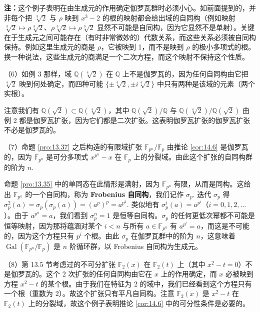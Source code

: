 \begin{example}
\noindent\textbf{注：}这个例子表明在由生成元的作用确定伽罗瓦群时必须小心。如前面提到的，并非每个把 \(\sqrt[3]{2}\) 与 \(\rho\) 映到 \(x^3-2\) 的根的映射都会给出域的自同构（例如映射 \(\sqrt[3]{2} \mapsto \rho\sqrt[3]{2}\)、\(\rho\sqrt[3]{2} \mapsto \rho\sqrt[3]{2}\) 显然不可能是自同构，因为它显然不是单射）。关键在于生成元之间可能存在（有时非常微妙的）代数关系，而这些关系必须被自同构保持。例如这里生成元的商是 \(\rho\)，它被映到 1，而不是映到 \(\rho\) 的极小多项式的根。换一种说法，这些生成元的商满足一个二次方程，而这个映射不保持这个性质。

（6）如例 3 那样，域 \(\mathbb{Q}(\sqrt[4]{2})\) 在 \(\mathbb{Q}\) 上不是伽罗瓦的，因为任何自同构由它把 \(\sqrt[4]{2}\) 映到何处确定，而四种可能 \(\{\pm\sqrt[4]{2}, \pm i\sqrt[4]{2}\}\) 中只有两种是该域的元素（两个实根）。

注意我们有 \(\mathbb{Q}(\sqrt{2}) \subset \mathbb{Q}(\sqrt[4]{2})\)，其中 \(\mathbb{Q}(\sqrt{2})/\mathbb{Q}\) 与 \(\mathbb{Q}(\sqrt[4]{2})/\mathbb{Q}(\sqrt{2})\) 由例 2 都是伽罗瓦扩张，因为它们都是二次扩张。这表明伽罗瓦扩张的伽罗瓦扩张不必是伽罗瓦的。

（7）命题 \ref{pro:13.37} 之后构造的有限域扩张 \(\mathbb{F}_{p^n}/\mathbb{F}_p\) 由推论 \ref{cor:14.6} 是伽罗瓦的，因为 \(\mathbb{F}_{p^n}\) 是可分多项式 \(x^{p^n}-x\) 在 \(\mathbb{F}_p\) 上的分裂域。由此这个扩张的自同构群的阶为 \(n\).

命题 \ref{pro:13.35} 中的单同态在此情形是满射，因为 \(\mathbb{F}_{p^n}\) 有限，从而是同构。这给出 \(\mathbb{F}_{p^n}\) 的一个自同构，称为 \textbf{Frobenius 自同构}，我们记作 \(\sigma_p\). 迭代 \(\sigma_p\) 得 \(\sigma_p^2(a) = \sigma_p(\sigma_p(a)) = (a^p)^p = a^{p^2}\). 类似地有 \(\sigma_p^i(a) = a^{p^i}\)（\(i = 0, 1, 2, \ldots\)）。由于 \(a^{p^n} = a\)，我们看到 \(\sigma_p^n = 1\) 是恒等自同构。\(\sigma_p\) 的任何更低次幂都不可能是恒等映射，因为那将蕴涵对某个 \(i < n\) 与所有 \(a \in \mathbb{F}_{p^n}\) 有 \(a^{p^i} = a\)，而这是不可能的，因为这个方程只有 \(p^i\) 个根。由此 \(\sigma_p\) 在伽罗瓦群中的阶为 \(n\)，这意味着 \(\operatorname{Gal}(\mathbb{F}_{p^n}/\mathbb{F}_p)\) 是 \(n\) 阶循环群，以 Frobenius 自同构为生成元。

（8）第 13.5 节考虑过的不可分扩张 \(\mathbb{F}_2(x)\) 在 \(\mathbb{F}_2(t)\) 上（其中 \(x^2-t = 0\)）不是伽罗瓦的。这个 2 次扩张的任何自同构由它在 \(x\) 上的作用确定，而 \(x\) 必被映到方程 \(x^2-t\) 的某个根。由于我们在特征为 2 的域中，我们已经看到这个方程只有一个根（重数为 2）。故这个扩张只有平凡自同构。注意 \(\mathbb{F}_2(x)\) 是 \(x^2-t\) 在 \(\mathbb{F}_2(t)\) 上的分裂域，故这个例子表明推论 \ref{cor:14.6} 中的可分性条件是必要的。
\end{example}

